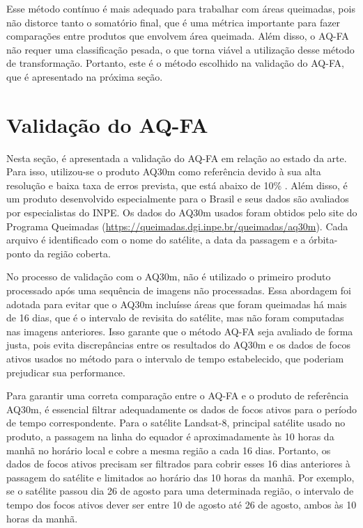 \documentclass[cic,tc]{iiufrgs}
\begin{document}
Esse método contínuo é mais adequado para trabalhar com áreas queimadas, pois não distorce tanto o somatório final, que é uma métrica importante para fazer comparações entre produtos que envolvem área queimada. Além disso, o AQ-FA não requer uma classificação pesada, o que torna viável a utilização desse método de transformação. Portanto, este é o método escolhido na validação do AQ-FA, que é apresentado na próxima seção.

\section{Validação do AQ-FA}
\label{sec:validacao_aq_fa}

Nesta seção, é apresentada a validação do AQ-FA em relação ao estado da arte. Para isso, utilizou-se o produto AQ30m como referência devido à sua alta resolução e baixa taxa de erros prevista, que está abaixo de 10\% \citep{melchiori2014landsat}. Além disso, é um produto desenvolvido especialmente para o Brasil e seus dados são avaliados por especialistas do INPE. Os dados do AQ30m usados foram obtidos pelo site do Programa Queimadas (\url{https://queimadas.dgi.inpe.br/queimadas/aq30m}). Cada arquivo é identificado com o nome do satélite, a data da passagem e a órbita-ponto da região coberta.

No processo de validação com o AQ30m, não é utilizado o primeiro produto processado após uma sequência de imagens não processadas. Essa abordagem foi adotada para evitar que o AQ30m incluísse áreas que foram queimadas há mais de 16 dias, que é o intervalo de revisita do satélite, mas não foram computadas nas imagens anteriores. Isso garante que o método AQ-FA seja avaliado de forma justa, pois evita discrepâncias entre os resultados do AQ30m e os dados de focos ativos usados no método para o intervalo de tempo estabelecido, que poderiam prejudicar sua performance.

Para garantir uma correta comparação entre o AQ-FA e o produto de referência AQ30m, é essencial filtrar adequadamente os dados de focos ativos para o período de tempo correspondente. Para o satélite Landsat-8, principal satélite usado no produto, a passagem na linha do equador é aproximadamente às 10 horas da manhã no horário local e cobre a mesma região a cada 16 dias. Portanto, os dados de focos ativos precisam ser filtrados para cobrir esses 16 dias anteriores à passagem do satélite e limitados ao horário das 10 horas da manhã. Por exemplo, se o satélite passou dia 26 de agosto para uma determinada região, o intervalo de tempo dos focos ativos dever ser entre 10 de agosto até 26 de agosto, ambos às 10 horas da manhã.
\end{document}

